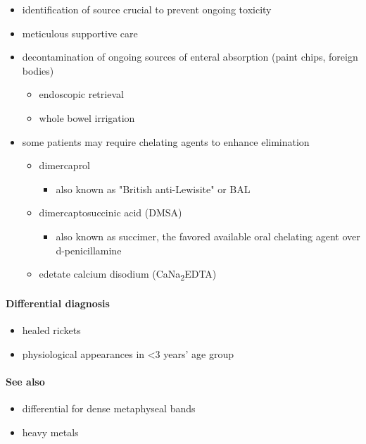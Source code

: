 \begin{itemize}
	\item
	identification of source crucial to prevent ongoing toxicity 
	\item
	meticulous supportive care
	\item
	decontamination of ongoing sources of enteral absorption (paint chips, foreign bodies)
	
	\begin{itemize}
		\item
		endoscopic retrieval
		\item
		whole bowel irrigation
	\end{itemize}
	\item
	some patients may require chelating agents to enhance elimination
	
	\begin{itemize}
		\item
		dimercaprol
		
		\begin{itemize}
			\item
			also known as "British anti-Lewisite" or BAL
		\end{itemize}
		\item
		dimercaptosuccinic acid (DMSA)
		
		\begin{itemize}
			\item
			also known as succimer, the favored available oral chelating agent over d-penicillamine
		\end{itemize}
		\item
		edetate calcium disodium (CaNa\textsubscript{2}EDTA)
	\end{itemize}
\end{itemize}

\paragraph{Differential diagnosis}

\begin{itemize}
	\item
	healed rickets
	\item
	physiological appearances in \textless3 years' age group
\end{itemize}


\paragraph{See also}

\begin{itemize}
	\item
	differential for dense metaphyseal bands
	\item
	heavy metals
\end{itemize}